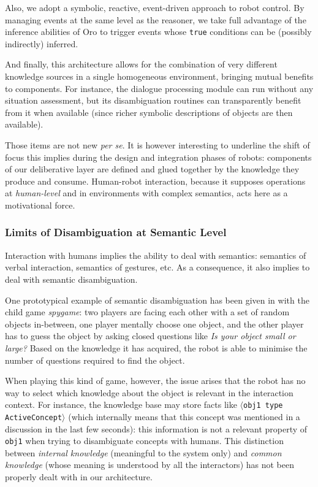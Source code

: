 \documentclass[preprint,3p,times]{elsarticle}
\newcommand{\concept}[1]{{\small \texttt{#1}}}
\newcommand{\stmt}[1]{{\footnotesize\tt$\langle$#1\relax$\rangle$}}
\begin{document}
Also, we adopt a symbolic, reactive, event-driven approach to robot control. By
managing events at the same level as the reasoner, we take full advantage of the
inference abilities of {\sc Oro} to trigger events whose \texttt{true}
conditions can be (possibly indirectly) inferred.

And finally, this architecture allows for the combination of very different
knowledge sources in a single homogeneous environment, bringing mutual
benefits to components. For instance, the dialogue processing module can
run without any situation assessment, but its disambiguation routines
can transparently benefit from it when available (since richer symbolic
descriptions of objects are then available).

Those items are not new \emph{per se}. It is however interesting to underline
the shift of focus this implies during the design and integration phases of
robots: components of our deliberative layer are defined and glued together by
the knowledge they produce and consume. Human-robot interaction, because it
supposes operations at \emph{human-level} and in environments with complex
semantics, acts here as a motivational force.


\subsubsection{Limits of Disambiguation at Semantic Level}

Interaction with humans implies the ability to deal with semantics: semantics of
verbal interaction, semantics of gestures, etc.  As a consequence, it also
implies to deal with semantic disambiguation.

One prototypical example of semantic disambiguation has been given in
\cite{Ros2010b} with the child game \emph{spygame}: two players are facing
each other with a set of random objects in-between, one player mentally choose
one object, and the other player has to guess the object by asking closed
questions like \emph{Is your object small or large?} Based on the knowledge it
has acquired, the robot is able to minimise the number of questions required to
find the object.

When playing this kind of game, however, the issue arises that the robot has no
way to select which knowledge about the object is relevant in the interaction
context. For instance, the knowledge base may store facts like \stmt{obj1 type
ActiveConcept} (which internally means that this concept was mentioned in a
discussion in the last few seconds): this information is not a relevant
property of \concept{obj1} when trying to disambiguate concepts with humans.
This distinction between \emph{internal knowledge} (meaningful to
the system only) and \emph{common knowledge} (whose meaning is understood by
all the interactors) has not been properly dealt with in our architecture.
\end{document}
